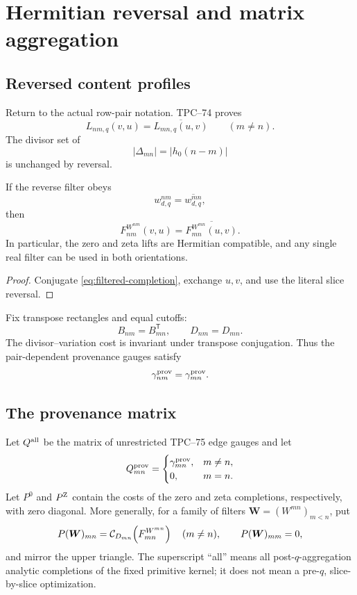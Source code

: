 \section{Hermitian reversal and matrix aggregation}
\label{sec:Hermitian-aggregation}

\subsection{Reversed content profiles}

Return to the actual row-pair notation.  TPC--74 proves
\[
 L_{nm,q}(v,u)
 =
 \overline{L_{mn,q}(u,v)}
 \qquad(m\ne n).
\]
The divisor set of
\[
 |\Delta_{mn}|=|h_0(n-m)|
\]
is unchanged by reversal.

\begin{proposition}
\label{prop:filtered-reversal}
If the reverse filter obeys
\[
 w^{nm}_{d,q}
 =
 \overline{w^{mn}_{d,q}},
\]
then
\[
 F^{W^{nm}}_{nm}(v,u)
 =
 \overline{F^{W^{mn}}_{mn}(u,v)}.
\]
In particular, the zero and zeta lifts are Hermitian compatible, and any
single real filter can be used in both orientations.
\end{proposition}

\begin{proof}
Conjugate \eqref{eq:filtered-completion}, exchange \(u,v\), and use the
literal slice reversal.
\end{proof}

Fix transpose rectangles and equal cutoffs:
\[
 B_{nm}=B_{mn}^{\mathsf T},
 \qquad
 D_{nm}=D_{mn}.
\]
The divisor--variation cost is invariant under transpose conjugation.
Thus the pair-dependent provenance gauges satisfy
\[
 \gamma^{\rm prov}_{nm}
 =
 \gamma^{\rm prov}_{mn}.
\]

\subsection{The provenance matrix}

Let \(Q^{\rm all}\) be the matrix of unrestricted TPC--75 edge gauges and
let
\[
 Q^{\rm prov}_{mn}
 =
 \begin{cases}
  \gamma^{\rm prov}_{mn},&m\ne n,\\
  0,&m=n.
 \end{cases}
\]
Let \(P^0\) and \(P^{\rm Z}\) contain the costs of the zero and zeta
completions, respectively, with zero diagonal.  More generally, for a
family of filters \(\boldsymbol W=(W^{mn})_{m<n}\), put
\[
 P(\boldsymbol W)_{mn}
 =
 \mathcal C_{D_{mn}}\!\left(F^{W^{mn}}_{mn}\right)
 \quad(m\ne n),
 \qquad
 P(\boldsymbol W)_{mm}=0,
\]
and mirror the upper triangle.
The superscript ``all'' means all post-\(q\)-aggregation analytic
completions of the fixed primitive kernel; it does not mean a
pre-\(q\), slice-by-slice optimization.

